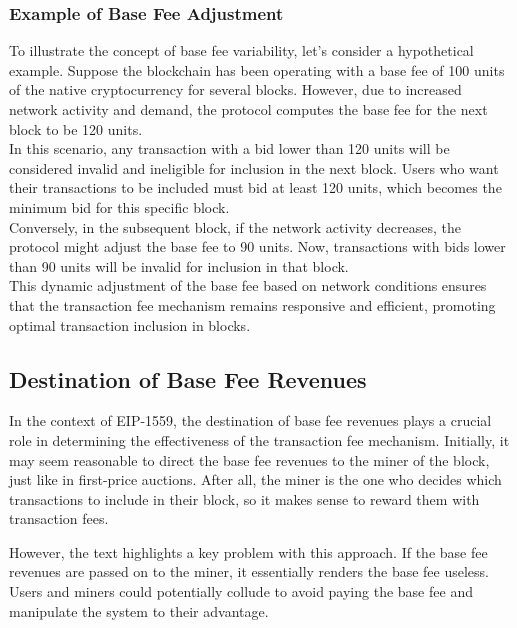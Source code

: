 \subsubsection{Example of Base Fee Adjustment}
To illustrate the concept of base fee variability, let's consider a hypothetical example. Suppose the blockchain has been operating with a base fee of 100 units of the native cryptocurrency for several blocks. However, due to increased network activity and demand, the protocol computes the base fee for the next block to be 120 units.\\
In this scenario, any transaction with a bid lower than 120 units will be considered invalid and ineligible for inclusion in the next block. Users who want their transactions to be included must bid at least 120 units, which becomes the minimum bid for this specific block.\\
Conversely, in the subsequent block, if the network activity decreases, the protocol might adjust the base fee to 90 units. Now, transactions with bids lower than 90 units will be invalid for inclusion in that block.\\
This dynamic adjustment of the base fee based on network conditions ensures that the transaction fee mechanism remains responsive and efficient, promoting optimal transaction inclusion in blocks.\\

\subsection{Destination of Base Fee Revenues}
In the context of EIP-1559, the destination of base fee revenues plays a crucial role in determining the effectiveness of the transaction fee mechanism. Initially, it may seem reasonable to direct the base fee revenues to the miner of the block, just like in first-price auctions. After all, the miner is the one who decides which transactions to include in their block, so it makes sense to reward them with transaction fees.

However, the text highlights a key problem with this approach. If the base fee revenues are passed on to the miner, it essentially renders the base fee useless. Users and miners could potentially collude to avoid paying the base fee and manipulate the system to their advantage.\\

